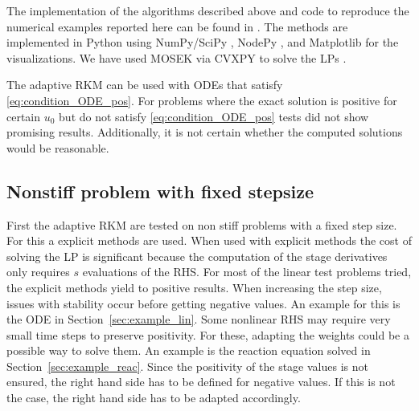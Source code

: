 \documentclass[a4paper]{article}
\numberwithin{equation}{section}
\theoremstyle{plain}
\theoremstyle{definition}
\numberwithin{theorem}{section}
\newcommand{\1}{\mathbbm{1}}
\newcommand{\todo}[1]{{\Large{\color{red}{#1}}}}
\begin{document}
The implementation of the algorithms described above and code to
reproduce the numerical examples reported here can be found in
\cite{repository}. \todo{TODO: New repository with DOI} %
The methods are implemented in Python using NumPy/SciPy
\cite{virtanen2020scipy}, NodePy \cite{nodepy08}, and
Matplotlib \cite{hunter2007matplotlib} for the visualizations.
We have used MOSEK \cite{mosek} via CVXPY to solve the LPs
\cite{cvxpy, cvxpy_rewriting}.

The adaptive RKM can be used with ODEs that satisfy \eqref{eq:condition_ODE_pos}.
For problems where the exact solution is positive for certain $u_0$ but do not satisfy \eqref{eq:condition_ODE_pos} tests did not show promising results. Additionally, it is not certain whether the computed solutions would be reasonable.


\subsection{Nonstiff problem with fixed stepsize}\label{sec:Ex_expl}
First the adaptive RKM are tested on non stiff problems with a fixed step size. For this a explicit methods are used.
When used with explicit methods the cost of solving the LP is significant because the computation of the stage derivatives only requires $s$ evaluations of the RHS.
For most of the linear test problems tried, the explicit methods yield to positive results.  
When increasing the step size, issues with stability occur before getting negative values.  
An example for this is the ODE in Section~\ref{sec:example_lin}.
Some nonlinear RHS may require very small time steps to preserve positivity.  
For these, adapting the weights could be a possible way to solve them. 
An example is the reaction equation solved in Section~\ref{sec:example_reac}.
Since the positivity of the stage values is not ensured, the right hand side has to be defined for negative values. If this is not the case, the right hand side has to be adapted accordingly.
\end{document}
